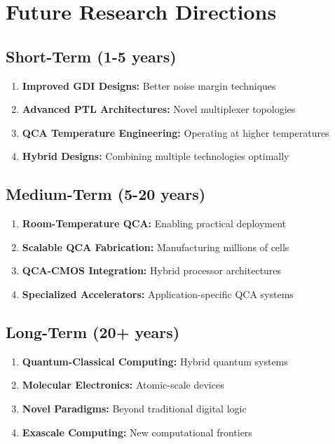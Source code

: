 \documentclass[12pt,a4paper,twoside]{report}
\begin{document}
\section{Future Research Directions}

\subsection{Short-Term (1-5 years)}

\begin{enumerate}
    \item \textbf{Improved GDI Designs:} Better noise margin techniques
    \item \textbf{Advanced PTL Architectures:} Novel multiplexer topologies
    \item \textbf{QCA Temperature Engineering:} Operating at higher temperatures
    \item \textbf{Hybrid Designs:} Combining multiple technologies optimally
\end{enumerate}

\subsection{Medium-Term (5-20 years)}

\begin{enumerate}
    \item \textbf{Room-Temperature QCA:} Enabling practical deployment
    \item \textbf{Scalable QCA Fabrication:} Manufacturing millions of cells
    \item \textbf{QCA-CMOS Integration:} Hybrid processor architectures
    \item \textbf{Specialized Accelerators:} Application-specific QCA systems
\end{enumerate}

\subsection{Long-Term (20+ years)}

\begin{enumerate}
    \item \textbf{Quantum-Classical Computing:} Hybrid quantum systems
    \item \textbf{Molecular Electronics:} Atomic-scale devices
    \item \textbf{Novel Paradigms:} Beyond traditional digital logic
    \item \textbf{Exascale Computing:} New computational frontiers
\end{enumerate}
\end{document}

